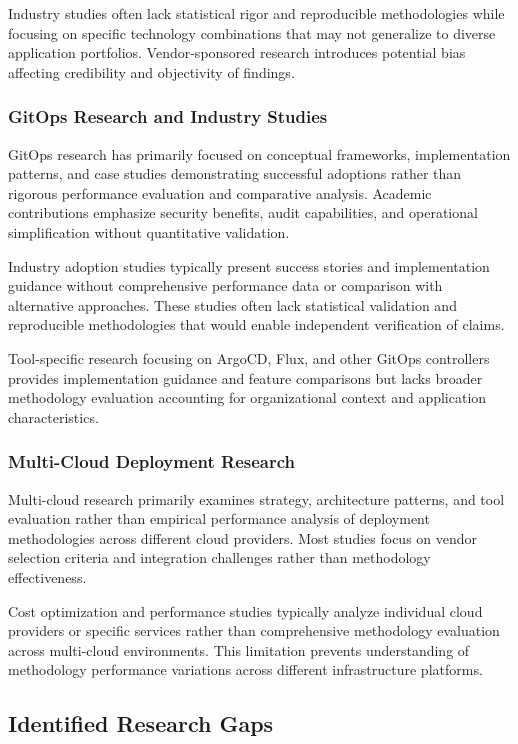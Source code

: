 Industry studies often lack statistical rigor and reproducible methodologies while focusing on specific technology combinations that may not generalize to diverse application portfolios. Vendor-sponsored research introduces potential bias affecting credibility and objectivity of findings.

\subsubsection{GitOps Research and Industry Studies}

GitOps research has primarily focused on conceptual frameworks, implementation patterns, and case studies demonstrating successful adoptions rather than rigorous performance evaluation and comparative analysis. Academic contributions emphasize security benefits, audit capabilities, and operational simplification without quantitative validation.

Industry adoption studies typically present success stories and implementation guidance without comprehensive performance data or comparison with alternative approaches. These studies often lack statistical validation and reproducible methodologies that would enable independent verification of claims.

Tool-specific research focusing on ArgoCD, Flux, and other GitOps controllers provides implementation guidance and feature comparisons but lacks broader methodology evaluation accounting for organizational context and application characteristics.

\subsubsection{Multi-Cloud Deployment Research}

Multi-cloud research primarily examines strategy, architecture patterns, and tool evaluation rather than empirical performance analysis of deployment methodologies across different cloud providers. Most studies focus on vendor selection criteria and integration challenges rather than methodology effectiveness.

Cost optimization and performance studies typically analyze individual cloud providers or specific services rather than comprehensive methodology evaluation across multi-cloud environments. This limitation prevents understanding of methodology performance variations across different infrastructure platforms.

\subsection{Identified Research Gaps}

